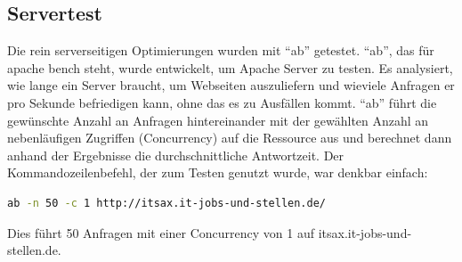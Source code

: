 \subsection{Servertest}
Die rein serverseitigen Optimierungen wurden mit ``ab'' getestet. ``ab'', das für apache bench steht, wurde entwickelt, um Apache Server zu testen. Es analysiert, wie lange ein Server braucht, um Webseiten auszuliefern und wieviele Anfragen er pro Sekunde befriedigen kann, ohne das es zu Ausfällen kommt. ``ab'' führt die gewünschte Anzahl an Anfragen hintereinander mit der gewählten Anzahl an nebenläufigen Zugriffen (Concurrency) auf die Ressource aus und berechnet dann anhand der Ergebnisse die durchschnittliche Antwortzeit. Der Kommandozeilenbefehl, der zum Testen genutzt wurde, war denkbar einfach:
\begin{lstlisting}[language=bash,label=ab mit Parametern,caption=ab mit Parametern]
ab -n 50 -c 1 http://itsax.it-jobs-und-stellen.de/
\end{lstlisting}
Dies führt 50 Anfragen mit einer Concurrency von 1 auf itsax.it-jobs-und-stellen.de.

